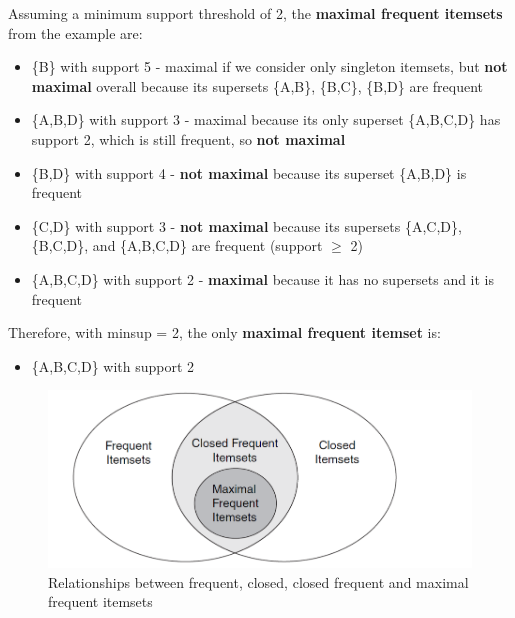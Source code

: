 Assuming a minimum support threshold of 2, the \textbf{maximal frequent itemsets} from the example are:
\begin{itemize}
   \item \{B\} with support 5 - maximal if we consider only singleton itemsets, but \textbf{not maximal} overall because its supersets \{A,B\}, \{B,C\}, \{B,D\} are frequent
   \item \{A,B,D\} with support 3 - maximal because its only superset \{A,B,C,D\} has support 2, which is still frequent, so \textbf{not maximal}
   \item \{B,D\} with support 4 - \textbf{not maximal} because its superset \{A,B,D\} is frequent
   \item \{C,D\} with support 3 - \textbf{not maximal} because its supersets \{A,C,D\}, \{B,C,D\}, and \{A,B,C,D\} are frequent (support $\geq$ 2)
   \item \{A,B,C,D\} with support 2 - \textbf{maximal} because it has no supersets and it is frequent
\end{itemize}

Therefore, with minsup = 2, the only \textbf{maximal frequent itemset} is:
\begin{itemize}
   \item \{A,B,C,D\} with support 2
\end{itemize}


\begin{figure}[htbp]
   \centering
   \includegraphics{images/08/sets.png}
   \caption{Relationships between frequent, closed, closed frequent and maximal frequent itemsets}
   \label{fig:08/sets}
\end{figure}

